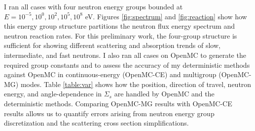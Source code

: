 
I ran all cases with four neutron energy groups bounded at $E=10^{-5}, 10^0, 10^2, 10^5, 10^8$
eV. Figures \ref{fig:spectrum} and \ref{fig:reaction} show how this energy group structure
partitions the neutron flux energy spectrum and neutron reaction rates. For this preliminary work,
the four-group structure is sufficient for showing different scattering and absorption trends of
slow, intermediate, and fast neutrons. I also ran all cases on OpenMC to generate the required
group constants and to assess the accuracy of my deterministic methods against OpenMC in
continuous-energy (OpenMC-CE) and multigroup (OpenMC-MG) modes. Table \ref{table:var} shows how the
position, direction of travel, neutron energy, and angle-dependence in $\Sigma_s$ are handled by
OpenMC and the deterministic methods. Comparing OpenMC-MG results with OpenMC-CE results allows us
to quantify errors arising from neutron energy group discretization and the scattering cross
section simplifications.

